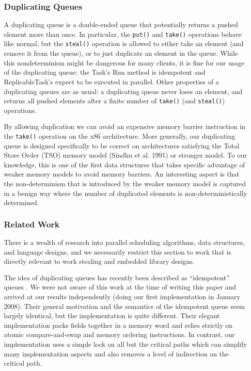 \subsubsection{Duplicating Queues}

A duplicating queue is a double-ended queue that potentially returns a
pushed element more than once. In particular, the \lstinline!put()!
and \lstinline!take()! operations behave like normal, but the
\lstinline!steal()! operation is allowed to either take an element
(and remove it from the queue), or to just duplicate an element in the
queue. While this nondeterminism might be dangerous for many clients,
it is fine for our usage of the duplicating queue: the Task's Run
method is idempotent and ReplicableTask's expect to be executed in
parallel. Other properties of a duplicating queues are as usual: a
duplicating queue never loses an element, and returns all pushed
elements after a finite number of \lstinline!take()! (and
\lstinline!steal()!) operations.

By allowing duplication we can avoid an expensive memory barrier
instruction in the \lstinline!take()! operation on the x86
architecture. More generally, our duplicating queue is designed
specifically to be correct on architectures satisfying the Total Store
Order (TSO) memory model (Sindhu et al. 1991) or stronger model. To
our knowledge, this is one of the first data structures that takes
specific advantage of weaker memory models to avoid memory
barriers. An interesting aspect is that the non-determinism that is
introduced by the weaker memory model is captured in a benign way
where the number of duplicated elements is non-deterministically
determined.

\subsubsection{Related Work}

There is a wealth of research into parallel scheduling algorithms,
data structures, and language designs, and we necessarily restrict
this section to work that is directly relevant to work stealing and
embedded library designs.

The idea of duplicating queues has recently been described as
``idempotent'' queues \cite{Michael2009}. We were not aware of this
work at the time of writing this paper and arrived at our results
independently (doing our first implementation in January 2008). Their
general motivation and the semantics of the idempotent queue seem
largely identical, but the implementation is quite different. Their
elegant implementation packs fields together in a memory word and
relies strictly on atomic compare-and-swap and memory ordering
instructions. In contrast, our implementation uses a simple lock on
all but the critical paths which can simplify many implementation
aspects and also removes a level of indirection on the critical path.

